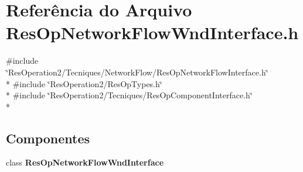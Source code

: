 \section{Referência do Arquivo Res\+Op\+Network\+Flow\+Wnd\+Interface.\+h}
\label{_res_op_network_flow_wnd_interface_8h}
{\ttfamily \#include \char`\"{}Res\+Operation2/\+Tecniques/\+Network\+Flow/\+Res\+Op\+Network\+Flow\+Interface.\+h\char`\"{}}\\*
{\ttfamily \#include \char`\"{}Res\+Operation2/\+Res\+Op\+Types.\+h\char`\"{}}\\*
{\ttfamily \#include \char`\"{}Res\+Operation2/\+Tecniques/\+Res\+Op\+Component\+Interface.\+h\char`\"{}}\\*
\subsection*{Componentes}
\begin{DoxyCompactItemize}
\item 
class {\bf Res\+Op\+Network\+Flow\+Wnd\+Interface}
\end{DoxyCompactItemize}
